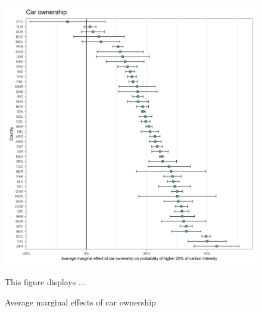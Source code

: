 \documentclass[12pt, a4paper]{article}
\newenvironment{subcaption}
{\strut
\vspace{-5pt}
\begin{minipage}[b]{0.9\textwidth}
  \hspace*{-\parindent}
  \footnotesize}
 {\end{minipage}}
\begin{document}
 \begin{figure}[ht!]
   \centering
  \caption{Average marginal effects of car ownership} \label{fig:F1_Car}
   \includegraphics{Analysis_Logit_Models_Marginal_Effects/Average_Marginal_Effects_affected_upper_80_car.01}
   \begin{subcaption}
     This figure displays ...
   \end{subcaption}

 \end{figure}
\end{document}
